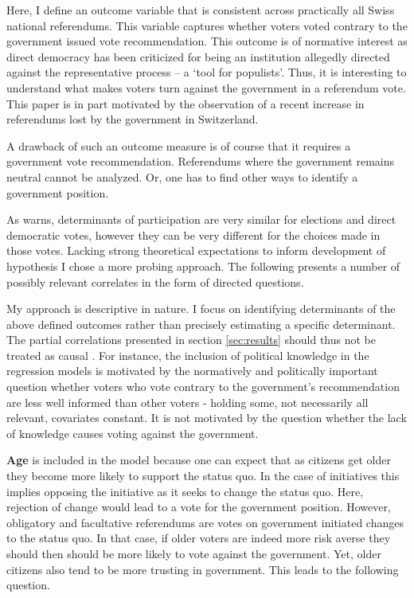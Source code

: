 \documentclass[11pt,a4paper]{article}\usepackage[]{graphicx}\usepackage[]{color}
\begin{document}
    Here, I define an outcome variable that is consistent across practically all Swiss national referendums. This variable captures whether voters voted contrary to the government issued vote recommendation. This outcome is of normative interest as direct democracy has been criticized for being an institution allegedly directed against the representative process -- a `tool for populists'. Thus, it is interesting to understand what makes voters turn against the government in a referendum vote. This paper is in part motivated by the observation of a recent increase in referendums lost by the government in Switzerland.
    
    A drawback of such an outcome measure is of course that it requires a government vote recommendation. Referendums where the government remains neutral cannot be analyzed. Or, one has to find other ways to identify a government position.
    
    As \citet{schoen_wahlen_2012} warns, determinants of participation are very similar for elections and direct democratic votes, however they can be very different for the choices made in those votes. Lacking strong theoretical expectations to inform development of hypothesis I chose a more probing approach. The following presents a number of possibly relevant correlates in the form of directed questions.
    
    My approach is descriptive in nature. I focus on identifying determinants of the above defined outcomes rather than precisely estimating a specific determinant. The partial correlations presented in section \ref{sec:results} should thus not be treated as causal \citep{keele_perils_2014}. For instance, the inclusion of political knowledge in the regression models is motivated by the normatively and politically important question whether voters who vote contrary to the government's recommendation are less well informed than other voters - holding some, not necessarily all relevant, covariates constant. It is not motivated by the question whether the lack of knowledge causes voting against the government.
    
    
    \textbf{Age} is included in the model because one can expect that as citizens get older they become more likely to support the status quo. In the case of initiatives this implies opposing the initiative as it seeks to change the status quo. Here, rejection of change would lead to a vote for the government position. However, obligatory and facultative referendums are votes on government initiated changes to the status quo. In that case, if older voters are indeed more risk averse they should then should be more likely to vote against the government. Yet, older citizens also tend to be more trusting in government. This leads to the following question.
    
\end{document}
